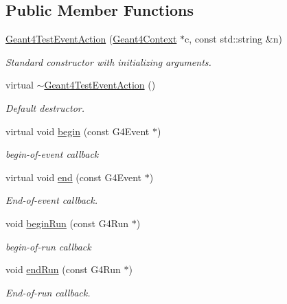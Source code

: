 \subsection*{Public Member Functions}
\begin{DoxyCompactItemize}
\item 
\hyperlink{class_d_d4hep_1_1_simulation_1_1_test_1_1_geant4_test_event_action_a00fe97a5df38edd9785f25af737cd7d0}{Geant4\+Test\+Event\+Action} (\hyperlink{class_d_d4hep_1_1_simulation_1_1_geant4_context}{Geant4\+Context} $\ast$c, const std\+::string \&n)
\begin{DoxyCompactList}\small\item\em Standard constructor with initializing arguments. \end{DoxyCompactList}\item 
virtual \hyperlink{class_d_d4hep_1_1_simulation_1_1_test_1_1_geant4_test_event_action_abef0a0d05514f5882003ae2f45e59ed7}{$\sim$\+Geant4\+Test\+Event\+Action} ()
\begin{DoxyCompactList}\small\item\em Default destructor. \end{DoxyCompactList}\item 
virtual void \hyperlink{class_d_d4hep_1_1_simulation_1_1_test_1_1_geant4_test_event_action_a9bce3a0885c7d2d5c6b03756ea3c4e23}{begin} (const G4\+Event $\ast$)
\begin{DoxyCompactList}\small\item\em begin-\/of-\/event callback \end{DoxyCompactList}\item 
virtual void \hyperlink{class_d_d4hep_1_1_simulation_1_1_test_1_1_geant4_test_event_action_a1b436d5b8c7b3f9fa93bc2b04946cad3}{end} (const G4\+Event $\ast$)
\begin{DoxyCompactList}\small\item\em End-\/of-\/event callback. \end{DoxyCompactList}\item 
void \hyperlink{class_d_d4hep_1_1_simulation_1_1_test_1_1_geant4_test_event_action_ab8bf5d68032c1a27015c9396eb713c5f}{begin\+Run} (const G4\+Run $\ast$)
\begin{DoxyCompactList}\small\item\em begin-\/of-\/run callback \end{DoxyCompactList}\item 
void \hyperlink{class_d_d4hep_1_1_simulation_1_1_test_1_1_geant4_test_event_action_ad5a3426363b043ddd19476871cd4a93c}{end\+Run} (const G4\+Run $\ast$)
\begin{DoxyCompactList}\small\item\em End-\/of-\/run callback. \end{DoxyCompactList}\end{DoxyCompactItemize}
